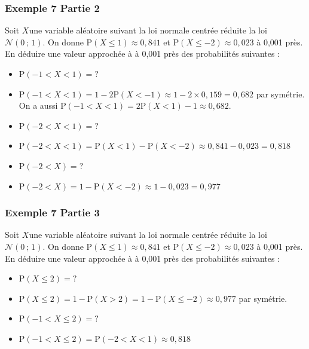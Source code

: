 \documentclass[xcolor=svgnames,t,final]{beamer}
\begin{document}
\begin{frame}
\frametitle{Exemple 7 Partie 2}
\label{exemple7}

Soit  $X $une variable aléatoire suivant la loi normale centrée réduite la loi $\mathcal{N}\left(0 \, ; \, 1\right)$. On donne $\text{P}\left( X \leqslant 1 \right) \approx 0,841$  et  $\text{P}\left( X \leqslant -2 \right) \approx 0,023$ à 0,001 près. En déduire une valeur approchée à à 0,001 près des probabilités suivantes :

\begin{itemize}
\item $\text{P}\left( -1<X<1 \right)=?$
\pause \item $\text{P}\left( -1<X<1 \right)=1-2\text{P}\left( X<-1 \right)\approx 1 - 2 \times 0,159 = 0,682$ par symétrie. On a aussi $\text{P}\left( -1<X<1 \right)=2 \text{P}\left(X<1 \right)-1\approx 0,682$.
\item $\text{P}\left( -2<X<1 \right)=?$
\pause \item $\text{P}\left( -2<X<1 \right)=\text{P}\left(X<1 \right)-\text{P}\left(X<-2 \right)\approx 0,841-0,023 = 0,818$
\item $\text{P}\left( -2<X \right)=?$
\pause \item $\text{P}\left( -2<X \right)=1-\text{P}\left(X<-2 \right)\approx 1-0,023 = 0,977$
\end{itemize}


\end{frame}






\begin{frame}
\frametitle{Exemple 7 Partie 3}
\label{exemple7}

Soit  $X $une variable aléatoire suivant la loi normale centrée réduite la loi $\mathcal{N}\left(0 \, ; \, 1\right)$. On donne $\text{P}\left( X \leqslant 1 \right) \approx 0,841$  et  $\text{P}\left( X \leqslant -2 \right) \approx 0,023$ à 0,001 près. En déduire une valeur approchée à à 0,001 près des probabilités suivantes :

\begin{itemize}
\item $\text{P}\left( X \leqslant 2 \right)=?$
\pause \item $\text{P}\left( X \leqslant 2 \right)=1- \text{P}\left(X>2 \right)=1- \text{P}\left(X\leqslant -2 \right) \approx 0,977$ par  symétrie.
\item $\text{P}\left(-1 < X \leqslant 2 \right)=?$
\pause \item $\text{P}\left(-1 < X \leqslant 2 \right)=\text{P}\left( -2<X<1 \right)\approx 0,818$
\end{itemize}


\end{frame}
\end{document}
